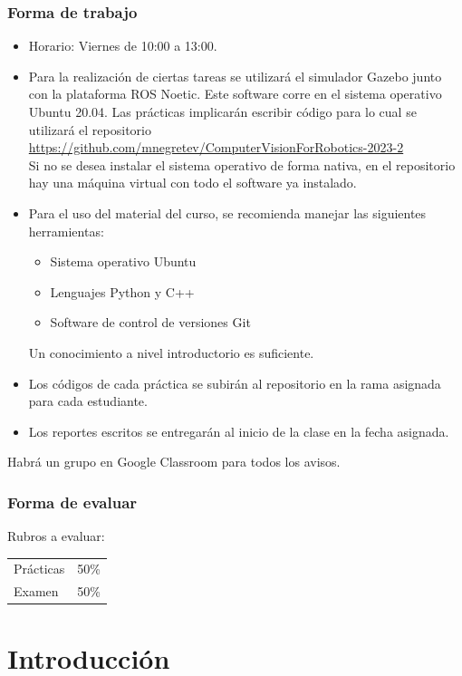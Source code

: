 \begin{frame}\frametitle{Forma de trabajo}
  \begin{itemize}
  \item Horario: Viernes de 10:00 a 13:00.\\
  \item Para la realización de ciertas tareas se utilizará el simulador Gazebo junto con la plataforma ROS Noetic. Este software corre en el sistema operativo Ubuntu 20.04. Las prácticas implicarán escribir código para lo cual se utilizará el repositorio\\
    \url{https://github.com/mnegretev/ComputerVisionForRobotics-2023-2}\\
    Si no se desea instalar el sistema operativo de forma nativa, en el repositorio hay una máquina virtual con todo el software ya instalado.
  \item Para el uso del material del curso, se recomienda manejar las siguientes herramientas:
    \begin{itemize}
    \item Sistema operativo Ubuntu
    \item Lenguajes Python y C++
    \item Software de control de versiones Git
    \end{itemize}
    Un conocimiento a nivel introductorio es suficiente.
  \item Los códigos de cada práctica se subirán al repositorio en la rama asignada para cada estudiante.
  \item Los reportes escritos se entregarán al inicio de la clase en la fecha asignada.
  \end{itemize}
  Habrá un grupo en Google Classroom para todos los avisos. 
\end{frame}

\begin{frame}\frametitle{Forma de evaluar}
  Rubros a evaluar:
  \begin{table}
  \begin{tabular}{lr}
    Prácticas & 50\%\\
    Examen    & 50\%\\
  \end{tabular}
  \end{table}
\end{frame}


\section{Introducción}


